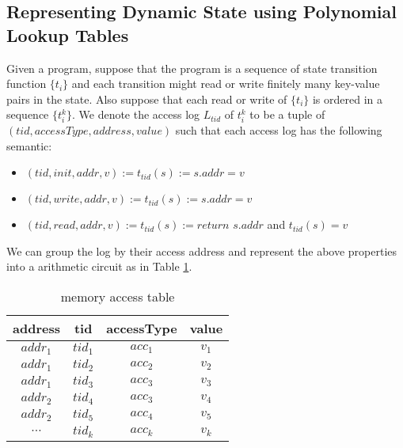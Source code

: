 \subsection{Representing Dynamic State using Polynomial Lookup Tables}
Given a program, suppose that the program is a sequence of state transition function $\{t_i\}$ and each transition might read or write finitely many key-value pairs in the state. Also suppose that each read or write of $\{t_i\}$ is ordered in a sequence $\{t_i^k\}$. We denote the access log $L_{tid}$ of $t_i^k$ to be a tuple of $(tid, accessType, address, value)$ such that each access log has the following semantic:
\begin{itemize}
    \item $(tid, init, addr, v ) := t_{tid}(s) := s.addr = v$
    \item $(tid, write, addr, v) := t_{tid}(s) := s.addr = v$
    \item $(tid, read, addr, v) := t_{tid}(s) := return \,\, s.addr$ and $t_{tid}(s) = v$
\end{itemize}
We can group the log by their access address and represent the above properties into a arithmetic circuit as in Table \ref{tbl:rw-table}.
\begin{table}[!h]
\begin{center}
\begin{tabular}{ | c | c | c | c | }
  \hline
  address & tid & accessType & value \\ 
  \hline
 $addr_1$ & $tid_1$ &  $acc_1$ & $v_1$ \\  
 $addr_1$ & $tid_2$ &  $acc_2$ & $v_2$ \\
  $addr_1$ & $tid_3$ &  $acc_3$ & $v_3$ \\  
 \hline
 $addr_2$ & $tid_4$ &  $acc_3$ & $v_4$ \\  
 $addr_2$ & $tid_5$ & $acc_4$ & $v_5$ \\
 \hline
 $\cdots$ & $tid_k$ & $acc_k$ & $v_k$ \\
 \hline
\end{tabular}
\caption{memory access table}
\label{tbl:rw-table}
\end{center}
\end{table}

